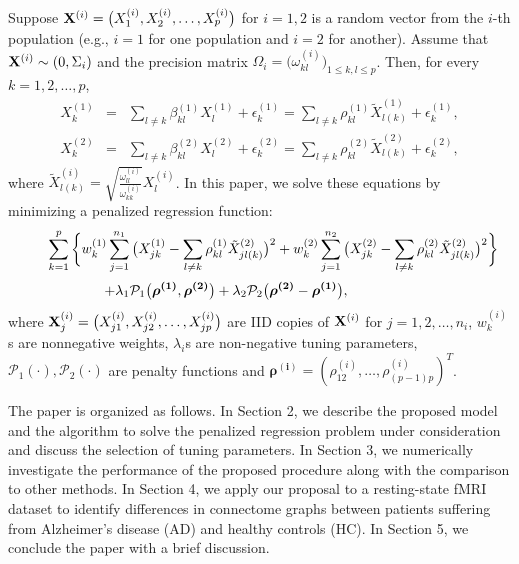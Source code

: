 \documentclass[useAMS,usenatbib,referee]{bio}
\newcommand{\bs}{\boldsymbol}
\begin{document}
{Suppose ${\bf X}^{(i)} =\big(X^{(i)}_{1},X^{(i)}_{2},\ldots,X^{(i)}_{p}\big)$ for $i=1,2$ is a random vector from the $i$-th population (e.g., $i=1$ for one population and $i=2$ for another). Assume that ${\bf X}^{(i)} \sim (0,\Sigma_i)$ and the precision matrix $\Omega_i=\big(\omega_{kl}^{(i)} \big)_{1\le k,l\le p}$. Then, for every $k=1,2,\ldots,p$,
\begin{eqnarray} 
X^{(1)}_{k} &=& \sum_{l \neq k} \beta^{(1)}_{kl} X^{(1)}_{l} + \epsilon^{(1)}_{k} = \sum_{l \neq k} \rho^{(1)}_{kl} \tilde{X}^{(1)}_{l(k)} + \epsilon^{(1)}_{k}, \label{eqn:iden} \nonumber\\
X^{(2)}_{k} &=& \sum_{l \neq k} \beta^{(2)}_{kl} X^{(2)}_{l} + \epsilon^{(2)}_{k} =\sum_{l \neq k} \rho^{(2)}_{kl} \tilde{X}^{(2)}_{l(k)} + \epsilon^{(2)}_{k}, \nonumber
\end{eqnarray}
where $\tilde{X}^{(i)}_{l(k)}= \sqrt{\frac{\omega^{(i)}_{ll}}{\omega^{(i)}_{kk}} } X^{(i)}_{l}$. 
In this paper, we solve these equations by minimizing a penalized regression function:
\begin{equation} \label{eqn:main}
\begin{array}{lll}  \medskip
&& \displaystyle
 \sum_{k=1}^p \bigg\{w^{(1)}_{k} \sum_{j=1}^{n_1} \big(X_{jk}^{(1)} -  \sum_{l \neq k} \rho^{(1)}_{kl} \tilde{X}_{jl(k)}^{(2)} \big)^2 + w^{(2)}_{k}
\sum_{j=1}^{n_2} \big( X_{jk}^{(2)} - \sum_{l \neq k} \rho^{(2)}_{kl} \tilde{X}_{jl(k)}^{(2)}  \big)^2 \bigg\}  \\
&& \displaystyle \qquad \qquad
+ \lambda_1 \mathcal{P}_1\big( \bs{\rho^{(1)}},\bs{\rho^{(2)}} \big) + \lambda_2 \mathcal{P}_2 \big( \bs{\rho^{(2)}} - \bs{\rho^{(1)}} \big),
\end{array}
\end{equation}
where ${\bf X}^{(i)}_j=\big(X_{j1}^{(i)}, X_{j2}^{(i)},\ldots,X_{jp}^{(i)}\big)$ are IID copies
of ${\bf X}^{(i)}$ for $j=1,2,\ldots,n_i$, $w^{(i)}_{k}$s are nonnegative weights, $\lambda_i$s are non-negative tuning parameters, $ \mathcal{P}_1(\cdot) ,
\mathcal{P}_2(\cdot) $ are penalty functions and $\bs{\rho^{(i)}}=(\rho^{(i)}_{12},\ldots,\rho^{(i)}_{(p-1)p})^T$. 

The paper is organized as follows. In Section 2, we describe the proposed model and the algorithm to solve the penalized regression problem under consideration and discuss the selection of tuning parameters. In Section 3, we numerically investigate the performance of the proposed procedure along with the comparison to other methods. In Section 4, we apply our proposal to a resting-state fMRI dataset to identify differences in connectome graphs between patients suffering from Alzheimer's disease (AD) and healthy controls (HC). In Section 5, we conclude the paper with a brief discussion.


}
\end{document}
